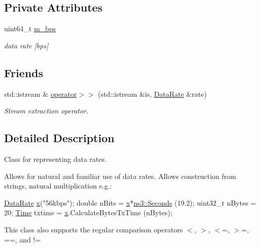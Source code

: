 \subsection*{Private Attributes}
\begin{DoxyCompactItemize}
\item 
uint64\+\_\+t \hyperlink{classns3_1_1DataRate_a2e1b49f1dd2e145d8923a368e9e21c01}{m\+\_\+bps}
\begin{DoxyCompactList}\small\item\em data rate \mbox{[}bps\mbox{]} \end{DoxyCompactList}\end{DoxyCompactItemize}
\subsection*{Friends}
\begin{DoxyCompactItemize}
\item 
std\+::istream \& \hyperlink{classns3_1_1DataRate_a080a58589340ad53257f3d101ec260b6}{operator$>$$>$} (std\+::istream \&is, \hyperlink{classns3_1_1DataRate}{Data\+Rate} \&rate)
\begin{DoxyCompactList}\small\item\em Stream extraction operator. \end{DoxyCompactList}\end{DoxyCompactItemize}


\subsection{Detailed Description}
Class for representing data rates. 

Allows for natural and familiar use of data rates. Allows construction from strings, natural multiplication e.\+g.\+: 
\begin{DoxyCode}
\hyperlink{classns3_1_1DataRate_abe139e6335e5ad820d35b24da7f06325}{DataRate} \hyperlink{lte__link__budget__x2__handover__measures_8m_a9336ebf25087d91c818ee6e9ec29f8c1}{x}(\textcolor{stringliteral}{"56kbps"});
\textcolor{keywordtype}{double} nBits = \hyperlink{lte__link__budget__x2__handover__measures_8m_a9336ebf25087d91c818ee6e9ec29f8c1}{x}*\hyperlink{group__timecivil_ga33c34b816f8ff6628e33d5c8e9713b9e}{ns3::Seconds} (19.2);
uint32\_t nBytes = 20;
\hyperlink{namespacens3_1_1TracedValueCallback_a7ffd3e7c142ffe7c8a1d2db9b8de38ec}{Time} txtime = \hyperlink{lte__link__budget__x2__handover__measures_8m_a9336ebf25087d91c818ee6e9ec29f8c1}{x}.CalculateBytesTxTime (nBytes);
\end{DoxyCode}
 This class also supports the regular comparison operators {\ttfamily $<$}, {\ttfamily $>$}, {\ttfamily $<$=}, {\ttfamily $>$=}, {\ttfamily ==}, and {\ttfamily !=} 

